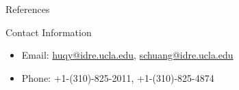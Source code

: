 \documentclass[final]{beamer}
\newlength{\onecolwid}
\begin{document}
\begin{frame}[t]
\begin{columns}[t]
\begin{column}{\onecolwid}
\begin{block}{References}
\end{block}




\begin{alertblock}{Contact Information}

\begin{itemize}
\item Email: \href{mailto:huqy@idre.ucla.edu}{huqy@idre.ucla.edu}, \href{mailto:schuang@idre.ucla.edu}{schuang@idre.ucla.edu}
\item Phone: +1-(310)-825-2011, +1-(310)-825-4874
\end{itemize}

\end{alertblock}


\end{column}
\end{columns}
\end{frame}
\end{document}
